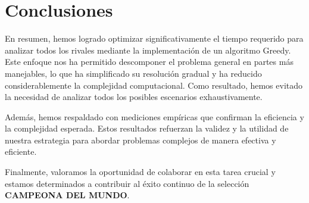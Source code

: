 \section{Conclusiones}

En resumen, hemos logrado optimizar significativamente el tiempo requerido para analizar todos los rivales mediante la implementación de un algoritmo Greedy. Este enfoque nos ha permitido descomponer el problema general en partes más manejables, lo que ha simplificado su resolución gradual y ha reducido considerablemente la complejidad computacional. Como resultado, hemos evitado la necesidad de analizar todos los posibles escenarios exhaustivamente.


Además, hemos respaldado con mediciones empíricas que confirman la eficiencia y la complejidad esperada. Estos resultados refuerzan la validez y la utilidad de nuestra estrategia para abordar problemas complejos de manera efectiva y eficiente.


Finalmente, valoramos la oportunidad de colaborar en esta tarea crucial y estamos determinados a contribuir al éxito continuo de la selección \textbf{CAMPEONA DEL MUNDO}.



